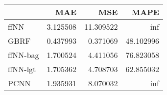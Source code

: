 \begin{tabular}{lrrr}
\toprule
{} &       MAE &        MSE &       MAPE \\
\midrule
ffNN     &  3.125508 &  11.309522 &        inf \\
GBRF     &  0.437993 &   0.371069 &  48.102996 \\
ffNN-bag &  1.700524 &   4.411056 &  76.823058 \\
ffNN-lgt &  1.705362 &   4.708703 &  62.855032 \\
PCNN     &  1.935931 &   8.070032 &        inf \\
\bottomrule
\end{tabular}
